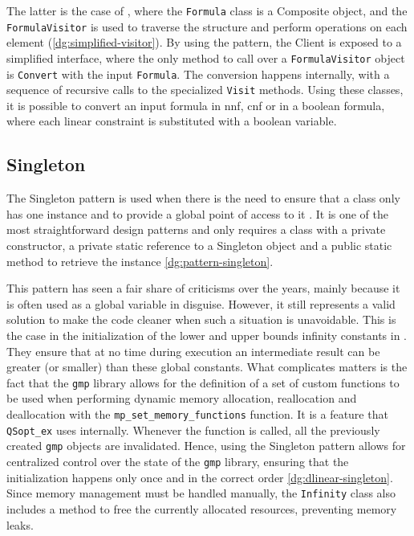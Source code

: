 The latter is the case of \dlinear, where the \texttt{Formula} class is a Composite object, and the \texttt{FormulaVisitor} is used to traverse the structure and perform operations on each element (\autoref{dg:simplified-visitor}).
By using the pattern, the Client is exposed to a simplified interface, where the only method to call over a \texttt{FormulaVisitor} object is \texttt{Convert} with the input \texttt{Formula}.
The conversion happens internally, with a sequence of recursive calls to the specialized \texttt{Visit} methods.
Using these classes, it is possible to convert an input formula in \gls{nnf}, \gls{cnf} or in a boolean formula, where each linear constraint is substituted with a boolean variable.


\subsection*{Singleton}

The Singleton pattern is used when there is the need to ensure that a class only has one instance and to provide a global point of access to it \cite{book:gof}.
It is one of the most straightforward design patterns and only requires a class with a private constructor, a private static reference to a Singleton object and a public static method to retrieve the instance \autoref{dg:pattern-singleton}.


This pattern has seen a fair share of criticisms over the years, mainly because it is often used as a global variable in disguise.
However, it still represents a valid solution to make the code cleaner when such a situation is unavoidable.
This is the case in the initialization of the lower and upper bounds infinity constants in \dlinear.
They ensure that at no time during execution an intermediate result can be greater (or smaller) than these global constants.
What complicates matters is the fact that the \texttt{gmp} library allows for the definition of a set of custom functions to be used when performing dynamic memory allocation, reallocation and deallocation with the \texttt{mp\_set\_memory\_functions} function.
It is a feature that \texttt{QSopt\_ex} uses internally.
Whenever the function is called, all the previously created \texttt{gmp} objects are invalidated.
Hence, using the Singleton pattern allows for centralized control over the state of the \texttt{gmp} library, ensuring that the initialization happens only once and in the correct order \autoref{dg:dlinear-singleton}.
Since memory management must be handled manually, the \texttt{Infinity} class also includes a method to free the currently allocated resources, preventing memory leaks.

